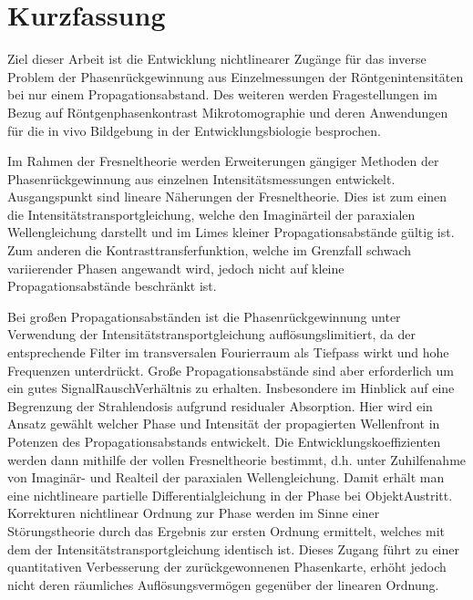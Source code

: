 \documentclass[
twoside,
openright,
titlepage,
numbers=noenddot,
headinclude,
fleqn,
a4paper,
footinclude=true,
cleardoublepage=empty,
abstractoff,
BCOR=5mm,
paper=a4,
fontsize=11pt,
british,ngerman,american,
]{scrreprt}
\begin{document}
\chapter*{Kurzfassung}

Ziel dieser Arbeit ist die Entwicklung nichtlinearer Zugänge für das
inverse Problem der Phasenrückgewinnung aus Einzelmessungen der
Röntgenintensitäten bei nur einem Propagationsabstand.  Des weiteren
werden Fragestellungen im Bezug auf Röntgenphasenkontrast\hyph
Mikrotomographie und deren Anwendungen für die in vivo Bildgebung in
der Entwicklungsbiologie besprochen.

Im Rahmen der Fresneltheorie werden Erweiterungen gängiger Me\-thoden
der Phasenrückgewinnung aus einzelnen Intensitätsmessungen entwickelt.
Ausgangspunkt sind lineare Näherungen der Fresneltheorie.  Dies ist
zum einen die Intensitätstransportgleichung, wel\-che den Imaginärteil
der paraxialen Wellengleichung darstellt und im Limes kleiner
Propagationsabstände gültig ist.  Zum anderen die
Kontrasttransferfunktion, welche im Grenzfall schwach variierender
Phasen angewandt wird, jedoch nicht auf kleine Propagationsabstän\-de
be\-schränkt ist.

Bei großen Propagationsabständen ist die Phasenrückgewinnung unter
Verwendung der Intensitätstransportgleichung auflösungslimitiert, da
der entsprechende Filter im transversalen Fourierraum als Tiefpass
wirkt und hohe Frequenzen unterdrückt.  Große Propagationsabstände
sind aber erforderlich um ein gutes Signal\hyph Rausch\hyph Verhältnis
zu erhalten.  Insbesondere im Hinblick auf eine Begrenzung der
Strahlendosis aufgrund residualer Absorption.  Hier wird ein An\-satz
gewählt welcher Phase und Intensität der propagierten Wellenfront in
Potenzen des Propagationsabstands entwickelt.  Die
Entwicklungskoeffizienten werden dann mithilfe der vollen
Fresneltheorie bestimmt, d.h. unter Zuhilfenahme von Imaginär- und
Realteil der paraxialen Wellengleichung.  Damit erhält man eine
nichtlineare partielle Differentialgleichung in der Phase bei
Objekt\hyph Austritt.  Korrekturen nichtlinear Ordnung zur Phase
werden im Sinne einer Störungstheorie durch das Ergebnis zur ersten
Ordnung ermittelt, welches mit dem der Intensitätstransportgleichung
identisch ist.  Dieses Zugang führt zu einer quantitativen
Verbesserung der zurückgewonnenen Phasenkarte, erhöht jedoch nicht
deren räumliches Auflösungsvermögen gegenüber der linearen Ordnung.
\end{document}
